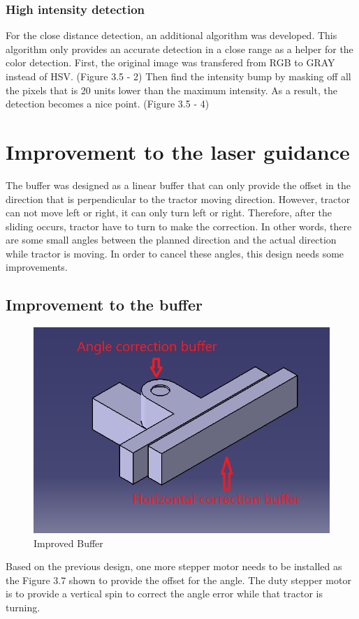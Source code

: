 \documentclass[letterpaper,12pt,oneside]{book}
\begin{document}
		\subsubsection{High intensity detection}
		
		For the close distance detection, an additional algorithm was developed. This algorithm only  provides an accurate detection in a close range as a helper for the color detection. First, the original image was transfered from RGB to GRAY instead of HSV. (Figure 3.5 - 2) Then find the intensity bump by masking off all the pixels that is 20 units lower than the maximum intensity. As a result, the detection becomes a nice point. (Figure 3.5 - 4)
		
		\section{Improvement to the laser guidance}
		
		The buffer was designed as a linear buffer that can only provide the offset in the direction that is perpendicular to the tractor moving direction. However, tractor can not move left or right, it can only turn left or right. Therefore, after the sliding occurs, tractor have to turn to make the correction. In other words, there are some small angles between the planned direction and the actual direction while tractor is moving. In order to cancel these angles, this design needs some improvements.
		
		\subsection{Improvement to the buffer}
		\begin{figure}[ht!]
			\begin{center}
				\includegraphics[scale = 0.8]{improvedbuffer.png}
				\caption{Improved Buffer}
			\end{center}
		\end{figure}
		Based on the previous design, one more stepper motor needs to be installed as the Figure 3.7 shown to provide the offset for the angle. The duty stepper motor is to provide a vertical spin to correct the angle error while that tractor is turning. 
		
\end{document}
